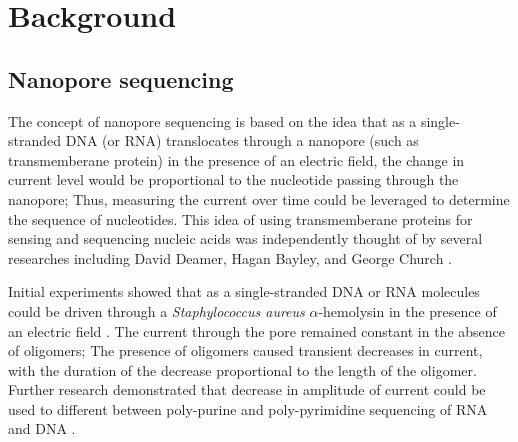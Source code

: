 \chapter{Background}
\label{ch2}

\section{Nanopore sequencing}

The concept of nanopore sequencing is based on the idea that as a
single-stranded DNA (or RNA) translocates through a nanopore (such as
transmemberane protein) in the presence of an electric field, the change
in current level would be proportional to the nucleotide passing through
the nanopore; Thus, measuring the current over time could be leveraged
to determine the sequence of nucleotides.
%
This idea of using transmemberane proteins for sensing and sequencing
nucleic acids was independently thought of by several researches
including David Deamer, Hagan Bayley, and George Church
\citep{deamer2016three,bayley2015nanopore,branton2010potential}.

Initial experiments showed that as a single-stranded DNA or RNA
molecules could be driven through a \emph{Staphylococcus aureus}
$\alpha$-hemolysin in the presence of an electric field
\citep{kasianowicz1996characterization}. The current through the pore
remained constant in the absence of oligomers; The presence of oligomers
caused transient decreases in current, with the duration of the decrease
proportional to the length of the oligomer.
Further research demonstrated that decrease in amplitude of current
could be used to different between poly-purine and poly-pyrimidine
sequencing of RNA \citep{akeson1999microsecond} and DNA
\citep{meller2000rapid}.

